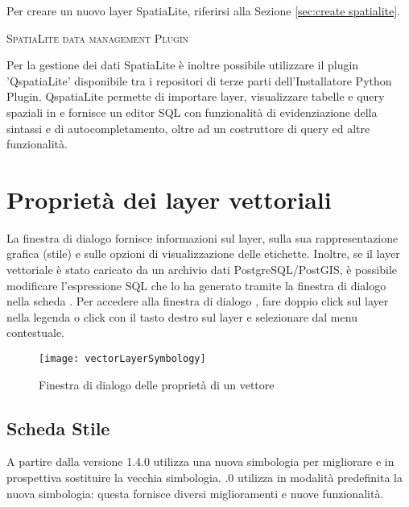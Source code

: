 
Per creare un nuovo layer SpatiaLite, riferirsi alla Sezione \ref{sec:create spatialite}.

\begin{Tip}\caption{\textsc{SpatiaLite data management Plugin}} 
Per la gestione dei dati SpatiaLite è inoltre possibile utilizzare il plugin 'QspatiaLite' disponibile 
tra i repositori di terze parti dell'Installatore \qg Python Plugin. QspatiaLite permette di 
importare layer, visualizzare tabelle e query spaziali in \qg e fornisce un editor SQL 
con funzionalità di evidenziazione della sintassi e di autocompletamento, oltre ad un 
costruttore di query ed altre funzionalità. 
\end{Tip}

\section{Proprietà dei layer vettoriali}\label{sec:vectorprops}

La finestra di dialogo  fornisce informazioni
sul layer, sulla sua rappresentazione grafica (stile) e sulle opzioni di
visualizzazione delle etichette. Inoltre, se il layer vettoriale è stato caricato 
da un archivio dati PostgreSQL/PostGIS, è possibile modificare l'espressione 
SQL che lo ha generato tramite la finestra di dialogo  
nella scheda . 
Per accedere alla finestra di dialogo , fare
doppio click sul layer nella legenda o click con il tasto destro sul layer e
selezionare  dal menu contestuale.

\begin{figure}[ht]
   \centering
   \texttt{[image: vectorLayerSymbology]}
   \caption{Finestra di dialogo delle proprietà di un vettore \nixcaption}\label{fig:vector_symbology}
 \end{figure}

\subsection{Scheda Stile}\label{sec:symbology}

A partire dalla versione 1.4.0 \qg utilizza una nuova simbologia per migliorare e in prospettiva 
sostituire la vecchia simbologia. .0 utilizza in modalità predefinita la nuova simbologia: 
questa fornisce diversi miglioramenti e nuove funzionalità.

